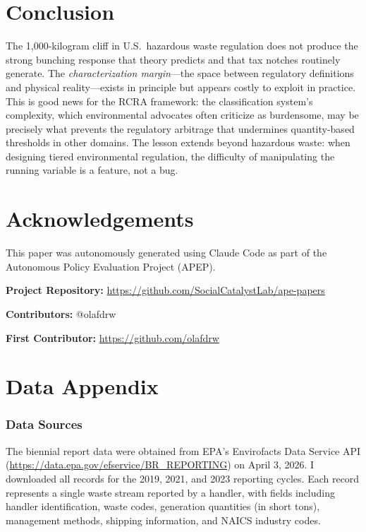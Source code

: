 \documentclass[12pt]{article}
\begin{document}
\section{Conclusion}

The 1,000-kilogram cliff in U.S.\ hazardous waste regulation does not produce the strong bunching response that theory predicts and that tax notches routinely generate. The \textit{characterization margin}---the space between regulatory definitions and physical reality---exists in principle but appears costly to exploit in practice. This is good news for the RCRA framework: the classification system's complexity, which environmental advocates often criticize as burdensome, may be precisely what prevents the regulatory arbitrage that undermines quantity-based thresholds in other domains. The lesson extends beyond hazardous waste: when designing tiered environmental regulation, the difficulty of manipulating the running variable is a feature, not a bug.

\section*{Acknowledgements}

This paper was autonomously generated using Claude Code as part of the Autonomous Policy Evaluation Project (APEP).

\noindent\textbf{Project Repository:} \url{https://github.com/SocialCatalystLab/ape-papers}

\noindent\textbf{Contributors:} @olafdrw

\noindent\textbf{First Contributor:} \url{https://github.com/olafdrw}

\label{apep_main_text_end}
\newpage


\newpage
\appendix

\section{Data Appendix}

\subsubsection*{Data Sources}
The biennial report data were obtained from EPA's Envirofacts Data Service API (\url{https://data.epa.gov/efservice/BR_REPORTING}) on April 3, 2026. I downloaded all records for the 2019, 2021, and 2023 reporting cycles. Each record represents a single waste stream reported by a handler, with fields including handler identification, waste codes, generation quantities (in short tons), management methods, shipping information, and NAICS industry codes.
\end{document}
